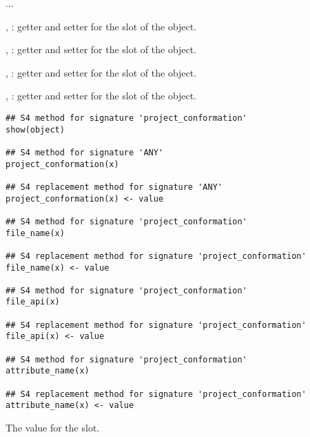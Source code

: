 \documentclass[letterpaper]{book}
\begin{document}
%
\begin{Description}\relax
...

, : getter and setter
for the  slot of the object.

, : getter and setter
for the  slot of the object.

, : getter and setter
for the  slot of the object.

, : getter and setter
for the  slot of the object.
\end{Description}
%
\begin{Usage}
\begin{verbatim}
## S4 method for signature 'project_conformation'
show(object)

## S4 method for signature 'ANY'
project_conformation(x)

## S4 replacement method for signature 'ANY'
project_conformation(x) <- value

## S4 method for signature 'project_conformation'
file_name(x)

## S4 replacement method for signature 'project_conformation'
file_name(x) <- value

## S4 method for signature 'project_conformation'
file_api(x)

## S4 replacement method for signature 'project_conformation'
file_api(x) <- value

## S4 method for signature 'project_conformation'
attribute_name(x)

## S4 replacement method for signature 'project_conformation'
attribute_name(x) <- value
\end{verbatim}
\end{Usage}
%
\begin{Arguments}
\begin{ldescription}
\item[\code{value}] The value for the slot.
\end{ldescription}
\end{Arguments}
\end{document}
